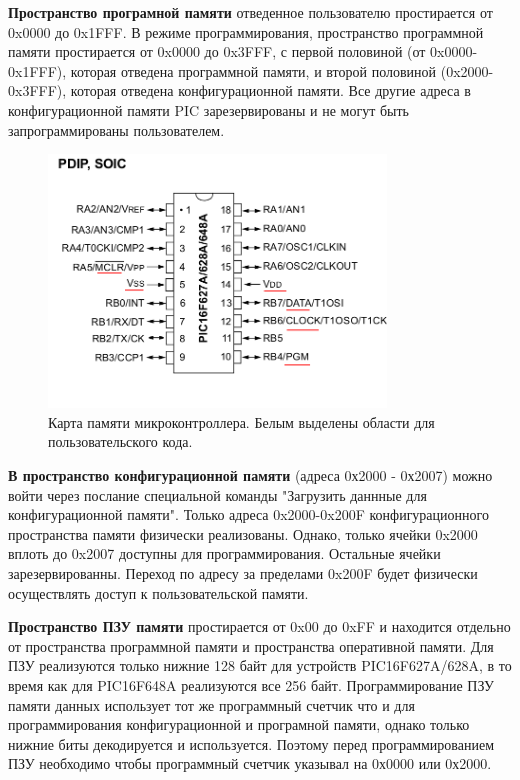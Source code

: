 \textbf{Пространство програмной памяти}
отведенное пользователю простирается от 0x0000 до
0x1FFF. В режиме программирования, пространство программной памяти
простирается от 0x0000 до 0x3FFF, с первой
половиной (от 0x0000-0x1FFF), которая отведена программной памяти, и
второй половиной (0x2000-0x3FFF), которая отведена конфигурационной
памяти. Все другие адреса в конфигурационной памяти PIC зарезервированы 
и не могут быть запрограммированы пользователем.

\begin{figure}[h!]
    \centering
    \includegraphics[width=0.8\textwidth]{2017-05-07_at_22:31:52_screenshot.png}
    \caption{Карта памяти микроконтроллера. Белым выделены области для пользовательского кода.}
\end{figure}

\textbf{В пространство конфигурационной памяти}
(адреса 0х2000 - 0х2007) можно войти через послание специальной команды 
"Загрузить даннные для конфигурационной памяти". Только адреса 0x2000-0x200F 
конфигурационного пространства памяти физически реализованы. Однако, только 
ячейки 0x2000 вплоть до 0x2007 доступны для программирования. Остальные ячейки
зарезервированны. Переход по адресу за пределами 0x200F будет физически осуществлять
доступ к пользовательской памяти.

\textbf{Пространство ПЗУ памяти}
простирается от 0x00 до 0xFF и находится отдельно от пространства программной памяти
и пространства оперативной памяти. Для ПЗУ реализуются только нижние 128 байт
для устройств PIC16F627A/628A, в то время как для PIC16F648A
реализуются все 256 байт. Программирование ПЗУ памяти данных использует тот же программный счетчик
что и для программирования конфигурационной и програмной памяти, однако только нижние биты
декодируется и используется. Поэтому перед программированием ПЗУ необходимо чтобы 
программный счетчик указывал на 0х0000 или 0х2000.

